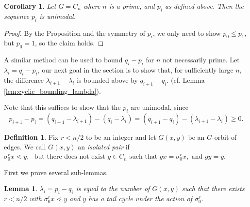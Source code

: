 \documentclass[10 pt]{amsart}
\theoremstyle{plain}
\newtheorem{lem}[thm]{Lemma}
\newtheorem{cor}[thm]{Corollary}
\theoremstyle{definition}
\newtheorem{defn}[thm]{Definition}
\theoremstyle{remark}
\numberwithin{equation}{section}
\begin{document}
\begin{cor}{\label{cor:cyclic_prime_unimodal}} Let $G = C_n$ where $n$ is a prime, and $p_i$ as defined above. Then the sequence $p_i$ is unimodal. 
\end{cor}

\begin{proof}
By the Proposition and the symmetry of $p_i$, we only need to show $p_0 \le p_1$, but $p_0 = 1$, so the claim holds.
\end{proof}

A similar method can be used to bound $q_i - p_i$ for $n$ not necessarily prime. Let $\lambda_i = q_i - p_i$, our next goal in the section is to show that,  for sufficiently large $n$, the difference $\lambda_{i+1} - \lambda_{i}$ is bounded above by  $q_{i+1} - q_i$. (cf. Lemma \ref{lem:cyclic_bounding_lambda}). 

Note that this suffices to show that the $p_i$ are unimodal, since $$p_{i+1} - p_{i} = (q_{i+1} - \lambda_{i+1}) - (q_i - \lambda_i) = (q_{i+1} - q_i) - (\lambda_{i+1}- \lambda_i) \ge 0.$$ 


\begin{defn}
Fix $r < n/2$ to be an integer and let $ G(x, y)$ be an $G$-orbit of edges. We call $G(x , y)$ an {\it isolated pair} if  $ \sigma_0^r x \lessdot y, \, \, \text{ but  there does not exist } g \in C_n \text{ such that } g x = \sigma_0 ^r x,  \text{ and }g y = y$. 
\end{defn}

First we prove several sub-lemmas. 

\begin{lem} \label{lem:bounding_sublemma1}
$\lambda_i = p_i - q_i$ is equal to the number of $G(x, y)$ such that there exists $r < n/2$ with $\sigma_0^r x \lessdot y$ and $y$ has a tail cycle under the action of $\sigma_0^r$.
\end{lem}
\end{document}
